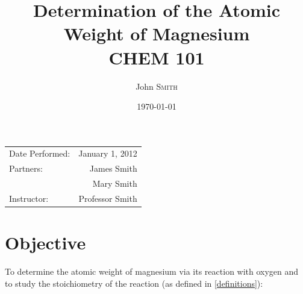 \documentclass{article}
\title{Determination of the Atomic \\ Weight of Magnesium \\ CHEM 101} %
\author{John \textsc{Smith}} %
\date{\today} %
\begin{document}
\begin{CJK*}{UTF8}{gkai}

\maketitle %

\begin{center}
\begin{tabular}{l r}
Date Performed: & January 1, 2012 \\ %
Partners: & James Smith \\ %
& Mary Smith \\
Instructor: & Professor Smith %
\end{tabular}
\end{center}



\section{Objective}

To determine the atomic weight of magnesium via its reaction with oxygen and to study the stoichiometry of the reaction (as defined in \ref{definitions}):\\

\begin{center}\end{center}



\end{CJK*}
\end{document}
